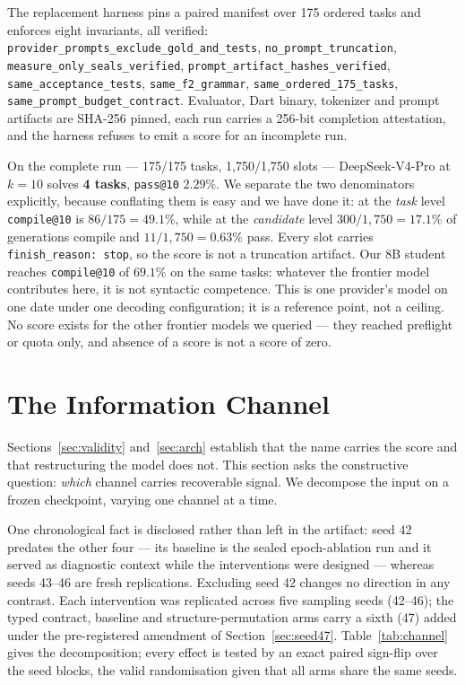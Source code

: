 \documentclass[conference]{IEEEtran}
\makeatletter
\newcommand{\passat}[1]{\texttt{pass@#1}\xspace}
\newcommand{\compileat}[1]{\texttt{compile@#1}\xspace}
\makeatother
\begin{document}
\begin{sloppypar}
The replacement harness pins a paired manifest over 175 ordered tasks and
enforces eight invariants, all verified:
{\footnotesize\texttt{provider\_prompts\_exclude\_gold\_and\_tests}},
{\footnotesize\texttt{no\_prompt\_truncation}},
{\footnotesize\texttt{measure\_only\_seals\_verified}},
{\footnotesize\texttt{prompt\_artifact\_hashes\_verified}},
{\footnotesize\texttt{same\_acceptance\_tests}},
{\footnotesize\texttt{same\_f2\_grammar}},
{\footnotesize\texttt{same\_ordered\_175\_tasks}},
{\footnotesize\texttt{same\_prompt\_budget\_contract}}. Evaluator, Dart binary, tokenizer and
prompt artifacts are SHA-256 pinned, each run carries a 256-bit completion
attestation, and the harness refuses to emit a score for an incomplete run.
\end{sloppypar}

On the complete run --- 175/175 tasks, 1{,}750/1{,}750 slots --- DeepSeek-V4-Pro
at $k{=}10$ solves \textbf{4 tasks}, \passat{10} $2.29\%$. We separate the two
denominators explicitly, because conflating them is easy and we have done it:
at the \emph{task} level \compileat{10} is $86/175 = 49.1\%$, while at the
\emph{candidate} level $300/1{,}750 = 17.1\%$ of generations compile and
$11/1{,}750 = 0.63\%$ pass. Every slot carries \texttt{finish\_reason: stop}, so
the score is not a truncation artifact. Our 8B student reaches \compileat{10} of
$69.1\%$ on the same tasks: whatever the frontier model contributes here, it is
not syntactic competence. This is one provider's model on one date under one
decoding configuration; it is a reference point, not a ceiling. No score exists
for the other frontier models we queried --- they reached preflight or quota only,
and absence of a score is not a score of zero.

\section{The Information Channel}
\label{sec:channel}
Sections~\ref{sec:validity} and~\ref{sec:arch} establish that the name carries
the score and that restructuring the model does not. This section asks the
constructive question: \emph{which} channel carries recoverable signal. We
decompose the input on a frozen checkpoint, varying one channel at a time.

One chronological fact is disclosed rather than left in the artifact: seed 42
predates the other four --- its baseline is the sealed epoch-ablation run and it
served as diagnostic context while the interventions were designed --- whereas
seeds 43--46 are fresh replications. Excluding seed 42 changes no direction in
any contrast. Each intervention was replicated across five sampling seeds (42--46); the typed
contract, baseline and structure-permutation arms carry a sixth (47) added under
the pre-registered amendment of Section~\ref{sec:seed47}. Table~\ref{tab:channel}
gives the decomposition; every effect is tested by an exact paired sign-flip over
the seed blocks, the valid randomisation given that all arms share the same
seeds.
\end{document}
